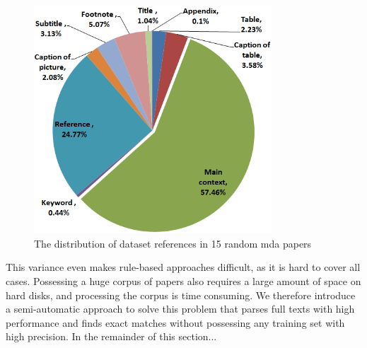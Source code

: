\documentclass{IOS-Book-Article}
\begin{document}
\begin{figure}[h]
	\centering
	\includegraphics[width=3.5in]{DistPlaces3.PNG} 
	\caption{The distribution of dataset references in 15 random mda papers}
	\label{fig:places-example}
\end{figure}

This variance even makes rule-based approaches difficult, as it is hard to cover all cases. 
Possessing a huge corpus of papers also requires a large amount of space on hard disks, and processing the corpus is time consuming.
We therefore introduce a semi-automatic approach to solve this problem that parses full texts with high performance and finds exact matches without possessing any training set with high precision. 
In the remainder of this section...  
\end{document}
